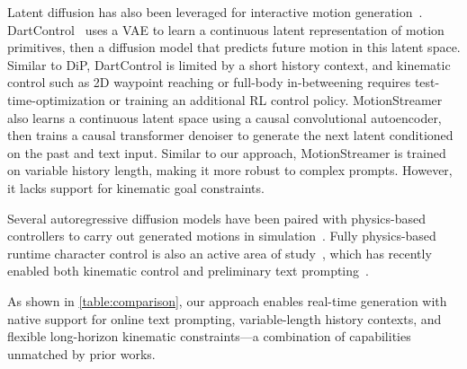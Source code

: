 Latent diffusion has also been leveraged for interactive motion generation~\cite{zhao2025DartControl,xiao2025motionstreamer,cen2025ready_to_react}.
DartControl~\cite{zhao2025DartControl} uses a VAE to learn a continuous latent representation of motion primitives, then a diffusion model that predicts future motion in this latent space. Similar to DiP, DartControl is limited by a short history context, and kinematic control such as 2D waypoint reaching or full-body in-betweening requires test-time-optimization or training an additional RL control policy.
MotionStreamer~\cite{xiao2025motionstreamer} also learns a continuous latent space using a causal convolutional autoencoder, then trains a causal transformer denoiser to generate the next latent conditioned on the past and text input. Similar to our approach, MotionStreamer is trained on variable history length, making it more robust to complex prompts. However, it lacks support for kinematic goal constraints.

Several autoregressive diffusion models have been paired with physics-based controllers to carry out generated motions in simulation~\cite{tevet2025closd,wu2025uniphys,huang2025diffusecloc,rempe2023trace,ren2023insactor}. 
Fully physics-based runtime character control is also an active area of study~\cite{peng2022ase,luo2023universal}, which has recently enabled both kinematic control and preliminary text prompting~\cite{tessler2024maskedmimic,wu2025uniphys}. 

As shown in \cref{table:comparison}, our approach enables real-time generation with native support for online text prompting, variable-length history contexts, and flexible long-horizon kinematic constraints—a combination of capabilities unmatched by prior works.

